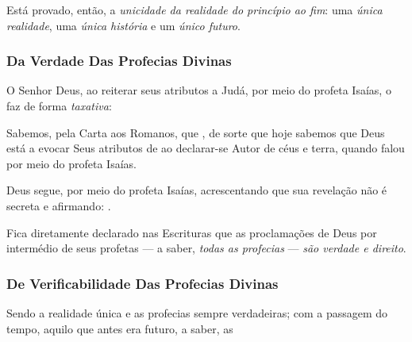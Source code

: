     Está provado, então, a \emph{unicidade da realidade do princípio  ao  fim}:  uma  \emph{única  realidade},  uma  \emph{única
    história} e um \emph{único futuro}.

    \subsubsection{Da Verdade Das Profecias Divinas}

    O Senhor Deus, ao reiterar seus atributos a Judá, por meio do profeta Isaías, o faz de forma \emph{taxativa}:


    Sabemos, pela Carta aos Romanos, que , de sorte que hoje sabemos que Deus está a evocar  Seus  atributos  de   ao declarar-se Autor de céus e terra, quando falou por meio do profeta Isaías.

    Deus segue, por meio do profeta Isaías, acrescentando que sua revelação não é secreta e  afirmando:  .

    Fica diretamente declarado nas Escrituras que as proclamações  de  Deus  por  intermédio  de  seus  profetas  ---  a  saber,
    \emph{todas as profecias} --- \emph{são verdade e direito}.

    \subsubsection{De Verificabilidade Das Profecias Divinas}

    Sendo a realidade única e as profecias sempre verdadeiras; com a passagem do tempo, aquilo que antes era futuro, a saber, as 



